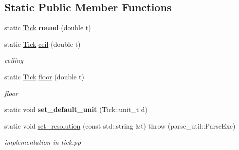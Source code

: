 \subsection*{Static Public Member Functions}
\begin{DoxyCompactItemize}
\item 
static \hyperlink{classMetaSim_1_1Tick}{Tick} {\bfseries round} (double t)\hypertarget{classMetaSim_1_1Tick_a98c4a304c06f2caf0ef90de26f53569b}{}\label{classMetaSim_1_1Tick_a98c4a304c06f2caf0ef90de26f53569b}

\item 
static \hyperlink{classMetaSim_1_1Tick}{Tick} \hyperlink{classMetaSim_1_1Tick_a3a0619e1e21120f00ec0b50395cae780}{ceil} (double t)\hypertarget{classMetaSim_1_1Tick_a3a0619e1e21120f00ec0b50395cae780}{}\label{classMetaSim_1_1Tick_a3a0619e1e21120f00ec0b50395cae780}

\begin{DoxyCompactList}\small\item\em ceiling \end{DoxyCompactList}\item 
static \hyperlink{classMetaSim_1_1Tick}{Tick} \hyperlink{classMetaSim_1_1Tick_a4dca712eeda03c032f0c3fe5533cc615}{floor} (double t)\hypertarget{classMetaSim_1_1Tick_a4dca712eeda03c032f0c3fe5533cc615}{}\label{classMetaSim_1_1Tick_a4dca712eeda03c032f0c3fe5533cc615}

\begin{DoxyCompactList}\small\item\em floor \end{DoxyCompactList}\item 
static void {\bfseries set\+\_\+default\+\_\+unit} (Tick\+::unit\+\_\+t d)\hypertarget{classMetaSim_1_1Tick_ad7b17cc5fbadcbeb29bc467ac0d6a94d}{}\label{classMetaSim_1_1Tick_ad7b17cc5fbadcbeb29bc467ac0d6a94d}

\item 
static void \hyperlink{classMetaSim_1_1Tick_a16cbae4eaab1ae3bb8d328a783a839af}{set\+\_\+resolution} (const std\+::string \&t)  throw (parse\+\_\+util\+::\+Parse\+Exc)\hypertarget{classMetaSim_1_1Tick_a16cbae4eaab1ae3bb8d328a783a839af}{}\label{classMetaSim_1_1Tick_a16cbae4eaab1ae3bb8d328a783a839af}

\begin{DoxyCompactList}\small\item\em implementation in tick.\+pp \end{DoxyCompactList}\end{DoxyCompactItemize}
